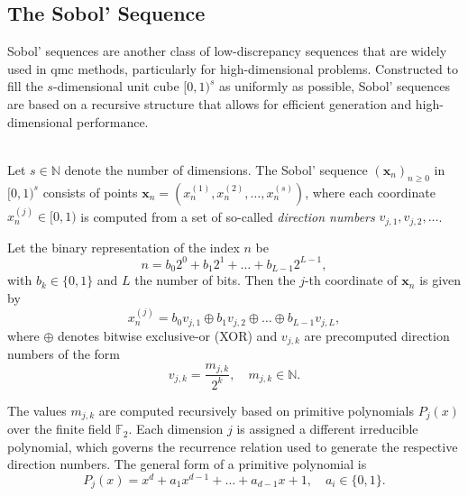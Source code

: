   \subsection{The Sobol' Sequence}

Sobol' sequences are another class of low-discrepancy sequences that are widely
used in \ac{qmc} methods, particularly for high-dimensional problems.
Constructed to fill the $s$-dimensional unit cube $[0,1)^s$ as uniformly as
possible, Sobol' sequences are based on a recursive structure that allows for
efficient generation and high-dimensional performance.

\begin{definition} \ \\
Let $s \in \mathbb{N}$ denote the number of dimensions. The Sobol' sequence $(\boldsymbol{x}_n)_{n\geq 0}$ in $[0,1)^s$ consists of points $\boldsymbol{x}_n = (x_n^{(1)}, x_n^{(2)}, \dots, x_n^{(s)})$, where each coordinate $x_n^{(j)} \in [0,1)$ is computed from a set of so-called \emph{direction numbers} $v_{j,1}, v_{j,2}, \dots$.

Let the binary representation of the index $n$ be
\begin{equation*}
  n = b_0 2^0 + b_1 2^1 + \dots + b_{L-1} 2^{L-1},
\end{equation*}
with $b_k \in \{0,1\}$ and $L$ the number of bits. Then the $j$-th coordinate of $\boldsymbol{x}_n$ is given by
\begin{equation*}
  x_n^{(j)} = b_0 v_{j,1} \oplus b_1 v_{j,2} \oplus \dots \oplus b_{L-1} v_{j,L},
\end{equation*}
where $\oplus$ denotes bitwise exclusive-or (XOR) and $v_{j,k}$ are precomputed direction numbers of the form
\begin{equation*}
  v_{j,k} = \frac{m_{j,k}}{2^k}, \quad m_{j,k} \in \mathbb{N}.
\end{equation*}
\end{definition}

The values $m_{j,k}$ are computed recursively based on primitive polynomials $P_j(x)$ over the finite field $\mathbb{F}_2$. Each dimension $j$ is assigned a different irreducible polynomial, which governs the recurrence relation used to generate the respective direction numbers. The general form of a primitive polynomial is
\begin{equation*}
  P_j(x) = x^d + a_1 x^{d-1} + \dots + a_{d-1} x + 1, \quad a_i \in \{0,1\}.
\end{equation*}

